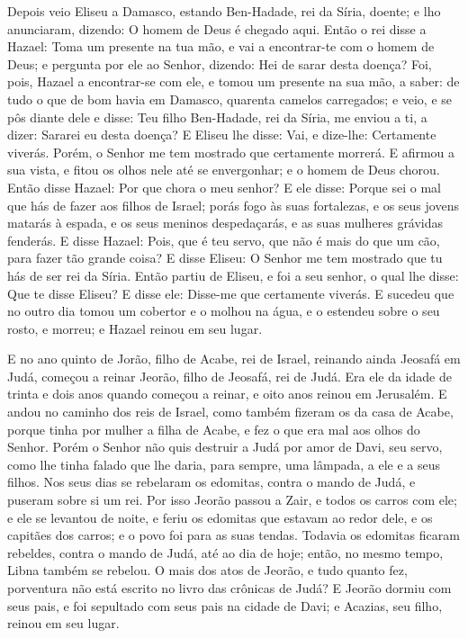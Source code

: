 Depois veio Eliseu a Damasco, estando Ben-Hadade, rei da Síria,
doente; e lho anunciaram, dizendo: O homem de Deus é chegado aqui.
Então o rei disse a Hazael: Toma um presente na tua mão, e vai a
encontrar-te com o homem de Deus; e pergunta por ele ao Senhor,
dizendo: Hei de sarar desta doença? Foi, pois, Hazael a
encontrar-se com ele, e tomou um presente na sua mão, a saber: de
tudo o que de bom havia em Damasco, quarenta camelos carregados; e
veio, e se pôs diante dele e disse: Teu filho Ben-Hadade, rei da
Síria, me enviou a ti, a dizer: Sararei eu desta doença? E
Eliseu lhe disse: Vai, e dize-lhe: Certamente viverás. Porém, o
Senhor me tem mostrado que certamente morrerá. E afirmou a
sua vista, e fitou os olhos nele até se envergonhar; e o homem de
Deus chorou. Então disse Hazael: Por que chora o meu senhor?
E ele disse: Porque sei o mal que hás de fazer aos filhos de Israel;
porás fogo às suas fortalezas, e os seus jovens matarás à espada, e
os seus meninos despedaçarás, e as suas mulheres grávidas fenderás.
E disse Hazael: Pois, que é teu servo, que não é mais do que
um cão, para fazer tão grande coisa? E disse Eliseu: O Senhor me tem
mostrado que tu hás de ser rei da Síria. Então partiu de
Eliseu, e foi a seu senhor, o qual lhe disse: Que te disse Eliseu? E
disse ele: Disse-me que certamente viverás. E sucedeu que no
outro dia tomou um cobertor e o molhou na água, e o estendeu sobre o
seu rosto, e morreu; e Hazael reinou em seu lugar.

E no ano quinto de Jorão, filho de Acabe, rei de Israel, reinando
ainda Jeosafá em Judá, começou a reinar Jeorão, filho de Jeosafá,
rei de Judá. Era ele da idade de trinta e dois anos quando
começou a reinar, e oito anos reinou em Jerusalém. E andou no
caminho dos reis de Israel, como também fizeram os da casa de Acabe,
porque tinha por mulher a filha de Acabe, e fez o que era mal aos
olhos do Senhor. Porém o Senhor não quis destruir a Judá por
amor de Davi, seu servo, como lhe tinha falado que lhe daria, para
sempre, uma lâmpada, a ele e a seus filhos. Nos seus dias se
rebelaram os edomitas, contra o mando de Judá, e puseram sobre si um
rei. Por isso Jeorão passou a Zair, e todos os carros com
ele; e ele se levantou de noite, e feriu os edomitas que estavam ao
redor dele, e os capitães dos carros; e o povo foi para as suas
tendas. Todavia os edomitas ficaram rebeldes, contra o mando
de Judá, até ao dia de hoje; então, no mesmo tempo, Libna também se
rebelou. O mais dos atos de Jeorão, e tudo quanto fez,
porventura não está escrito no livro das crônicas de Judá? E
Jeorão dormiu com seus pais, e foi sepultado com seus pais na cidade
de Davi; e Acazias, seu filho, reinou em seu lugar.


